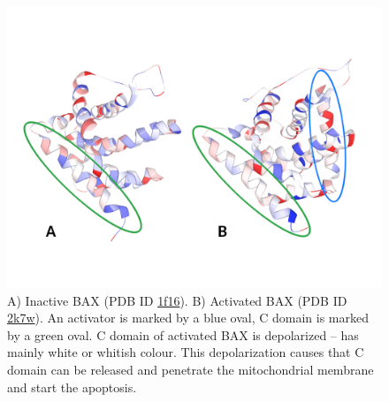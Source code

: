 \documentclass[oneside]{memoir}
\begin{document}
\begin{figure}
\renewcommand{\thefigure}{3}

\includegraphics[width=.9\linewidth]{figure3.png}

\caption{A) Inactive BAX (PDB ID \href{https://www.ebi.ac.uk/pdbe/entry/pdb/1f16}{1f16}). B) Activated BAX (PDB ID \href{https://www.ebi.ac.uk/pdbe/entry/pdb/2k7w}{2k7w}). An activator is marked by a blue oval, C domain is marked by a green oval. C domain of activated BAX is depolarized -- has mainly white or whitish colour. This depolarization causes that C domain can be released and penetrate the mitochondrial membrane and start the apoptosis.}
\end{figure}
\end{document}
